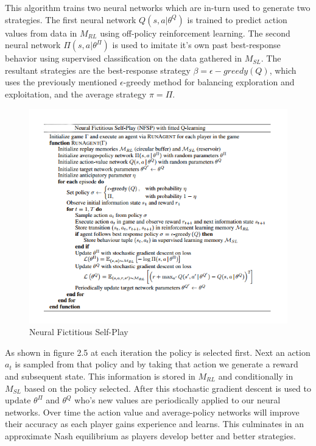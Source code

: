 This algorithm trains two neural networks which are in-turn used to generate two strategies.
The first neural network $Q(s,a|\theta^{Q})$ is trained to predict action values from data
in $M_{RL}$ using off-policy reinforcement learning.
The second neural network $\Pi(s, a | \theta^\Pi)$ is used to imitate it's own past best-response behavior
using supervised classification on the data gathered in $M_{SL}$.
The resultant strategies are the best-response strategy $\beta=\epsilon-greedy(Q)$, which
uses the previously mentioned $\epsilon$-greedy method for balancing exploration and exploitation,
and the average strategy $\pi=\Pi$.

\begin{figure}[!ht]
    \includegraphics[scale=.8]{images/NFSP_algorithm.png}
    \caption{Neural Fictitious Self-Play\citep{heinrich2016deep}}
\end{figure}

As shown in figure 2.5 at each iteration the policy is selected first.
Next an action $a_t$ is sampled from that policy and by taking that action we generate a reward
and subsequent state.
This information is stored in $M_{RL}$ and conditionally in $M_{SL}$ based on the policy selected.
After this stochastic gradient descent is used to update $\theta^\Pi$ and $\theta^Q$ who's new values
are periodically applied to our neural networks.
Over time the action value and average-policy networks will improve their
accuracy as each player gains experience and learns.
This culminates in an approximate Nash equilibrium as players develop better and better strategies.


